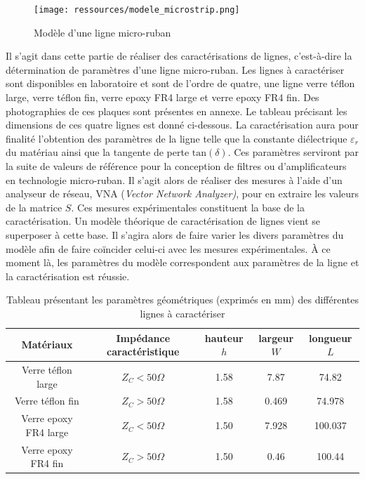 \documentclass[french]{article}
\begin{document}
\begin{figure}[H]
	\centering
	\texttt{[image: ressources/modele\_microstrip.png]}
	\caption{Modèle d'une ligne micro-ruban}
	\label{fig:modele_microstrip}
\end{figure}

Il s'agit dans cette partie de réaliser des caractérisations de lignes, c'est-à-dire la détermination de paramètres d'une ligne micro-ruban. Les lignes à caractériser sont disponibles en laboratoire et sont de l'ordre de quatre, une ligne verre téflon large, verre téflon fin, verre epoxy FR4 large et verre epoxy FR4 fin. Des photographies de ces plaques sont présentes en annexe. Le tableau précisant les dimensions de ces quatre lignes est donné ci-dessous. La caractérisation aura pour finalité l'obtention des paramètres de la ligne telle que la constante diélectrique $\varepsilon_r$ du matériau ainsi que la tangente de perte $\mbox{tan}(\delta)$. Ces paramètres serviront par la suite de valeurs de référence pour la conception de filtres ou d'amplificateurs en technologie micro-ruban. Il s'agit alors de réaliser des mesures à l'aide d'un analyseur de réseau, VNA (\textit{Vector Network Analyzer)}, pour en extraire les valeurs de la matrice $S$. Ces mesures expérimentales constituent la base de la caractérisation. Un modèle théorique de caractérisation de lignes vient se superposer à cette base. Il s'agira alors de faire varier les divers paramètres du modèle afin de faire coïncider celui-ci avec les mesures expérimentales. À ce moment là, les paramètres du modèle correspondent aux paramètres de la ligne et la caractérisation est réussie.


\begin{table}[H]
	\centering
	\begin{tabular}{|c|c|c|c|c|}
		\hline
		Matériaux & Impédance caractéristique & hauteur $h$ & largeur $W$ & longueur $L$\\
		\hline
		Verre téflon large & $Z_C < 50 \Omega$ & 1.58 & 7.87 & 74.82 \\
		\hline
		Verre téflon fin & $Z_C > 50 \Omega$ & 1.58 & 0.469 & 74.978\\
		\hline
		Verre epoxy FR4 large & $Z_C < 50 \Omega$ & 1.50 & 7.928 & 100.037\\
		\hline
		Verre epoxy FR4 fin & $Z_C > 50 \Omega$ & 1.50 & 0.46 & 100.44\\
		\hline
	\end{tabular}
	\caption{Tableau présentant les paramètres géométriques (exprimés en mm) des différentes lignes à caractériser}
	 \label{tab:geo_ligne}
\end{table}
\end{document}
